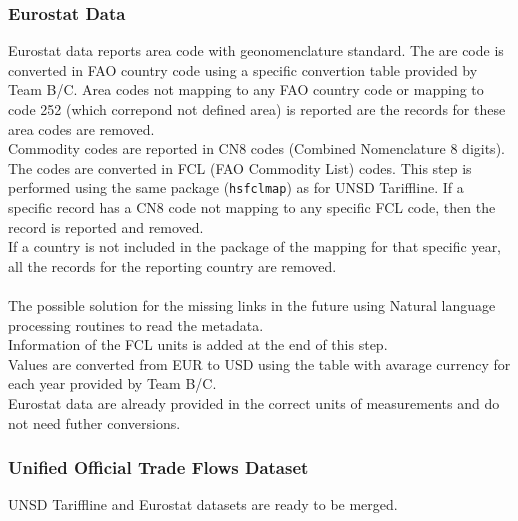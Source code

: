 \documentclass[nojss]{jss}\usepackage[]{graphicx}\usepackage[]{color}
\begin{document}
\subsubsection{Eurostat Data}
Eurostat data reports area code with geonomenclature standard. The are code is converted in FAO country code using a specific convertion table provided by Team B/C.  Area codes not mapping to any FAO country code or mapping to code 252 (which correpond not defined area) is reported are the records for these area codes are removed.\\
Commodity codes are reported in CN8 codes (Combined Nomenclature 8 digits). The codes are converted in FCL (FAO Commodity List) codes. This step is performed using the same package ({\tt hsfclmap}) as for UNSD Tariffline.
If a specific record has a CN8 code not mapping to any specific FCL code, then the record is reported and removed.\\
If a country is not included in the package of the mapping for that specific year, all the records for the reporting country are removed.\\\\
The possible solution for the missing links in the future using Natural language processing routines to read the metadata.\\
Information of the FCL units is added at the end of this step.\\
Values are converted from EUR to USD using the table with avarage currency for each year provided by Team B/C.\\
Eurostat data are already provided in the correct units of measurements and do not need futher conversions.

\subsubsection{Unified Official Trade Flows Dataset}
UNSD Tariffline and Eurostat datasets are ready to be merged.
\end{document}
